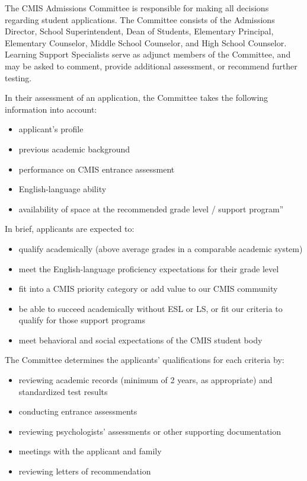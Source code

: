 \documentclass{report}
\begin{document}
The CMIS Admissions Committee is responsible for making all decisions regarding student applications. The Committee consists of the Admissions Director, School Superintendent, Dean of Students, Elementary Principal, Elementary Counselor, Middle School Counselor, and High School Counselor.    Learning Support Specialists serve as adjunct members of the Committee, and may be asked to comment, provide additional assessment, or recommend further testing.  

In their assessment of an application, the Committee takes the following information into account:

\begin{itemize}
\item applicant's profile
\item previous academic background
\item performance on CMIS entrance assessment
\item English-language ability
\item availability of space at the recommended grade level / support program”
\end{itemize}

In brief, applicants are expected to:

\begin{itemize}
\item qualify academically (above average grades in a comparable academic system)
\item meet the English-language proficiency expectations for their grade level
\item fit into a CMIS priority category or add value to our CMIS community
\item be able to succeed academically without ESL or LS, or fit our criteria to qualify for those support programs
\item meet behavioral and social expectations of the CMIS student body
\end{itemize}

 The Committee determines the applicants’ qualifications for each criteria by:

\begin{itemize}
\item reviewing academic records (minimum of 2 years, as appropriate) and standardized test results
\item conducting entrance assessments
\item reviewing psychologists' assessments or other supporting documentation
\item meetings with the applicant and family
\item reviewing letters of recommendation
\end{itemize}
\end{document}
